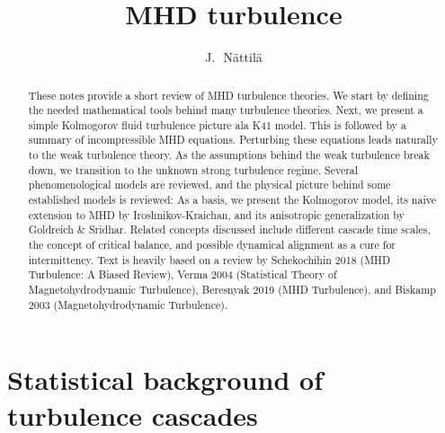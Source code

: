 \documentclass[usenatbib,twocolumn]{aastex63}
\begin{document}
\title{MHD turbulence}

\author{J.~\,N\"attil\"a}



\begin{abstract}
    These notes provide a short review of MHD turbulence theories.
    We start by defining the needed mathematical tools behind many turbulence theories.
    Next, we present a simple Kolmogorov fluid turbulence picture ala K41 model.
    This is followed by a summary of incompressible MHD equations.
    Perturbing these equations leads naturally to the weak turbulence theory.
    As the assumptions behind the weak turbulence break down, we transition to the unknown strong turbulence regime.
    Several phenomenological models are reviewed, and the physical picture behind some established models is reviewed:
    As a basis, we present the Kolmogorov model, its naive extension to MHD by Iroshnikov-Kraichan, and its anisotropic generalization by Goldreich \& Sridhar.
    Related concepts discussed include different cascade time scales, the concept of critical balance, and possible dynamical alignment as a cure for intermittency.
    Text is heavily based on a review by Schekochihin 2018 (MHD Turbulence: A Biased Review), Verma 2004 (Statistical Theory of Magnetohydrodynamic Turbulence), Beresnyak 2019 (MHD Turbulence), and Biskamp 2003 (Magnetohydrodynamic Turbulence).
\end{abstract}






\section{Statistical background of turbulence cascades}\label{sect:turb}
\end{document}
